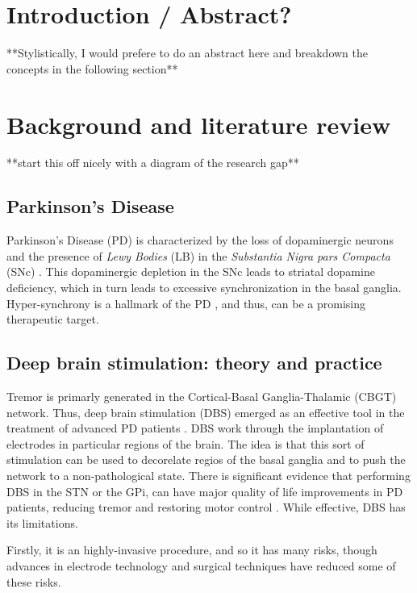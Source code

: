 \tableofcontents
\newpage

\section{Introduction / Abstract?}
**Stylistically, I would prefere to do an abstract here and breakdown the concepts in the
following section**
\section{Background and literature review}
**start this off nicely with a diagram of the research gap**

\subsection{Parkinson's Disease}
Parkinson's Disease (PD) is characterized by the loss of dopaminergic neurons and the presence of
\emph{Lewy Bodies} (LB) in the \emph{Substantia Nigra pars Compacta} (SNc)
\cite{del2018advances}. This dopaminergic depletion in the SNc leads to striatal dopamine
deficiency, which in turn leads to excessive synchronization in the basal ganglia.
Hyper-synchrony is a hallmark of the PD \cite{hammond2007pathological, helmich2012cerebral}, 
and thus, can be a promising therapeutic target.

\subsection{Deep brain stimulation: theory and practice}
Tremor is primarly generated in the Cortical-Basal Ganglia-Thalamic (CBGT) network. Thus, deep
brain stimulation (DBS) emerged as an effective tool in the treatment of advanced PD patients
\cite{del2018advances}. DBS work through the implantation of electrodes in particular regions
of the brain. The idea is that this sort of stimulation can be used to decorelate regios of the
basal ganglia and to push the network to a non-pathological state. There is significant evidence
that performing DBS in the STN or the GPi, can have major quality of life improvements in
PD patients, reducing tremor and restoring motor control \cite{rodriguez2005bilateral}. While
effective, DBS has its limitations.

Firstly, it is an highly-invasive procedure, and so it has many risks, though advances in
electrode technology and surgical techniques have reduced some of these risks.

